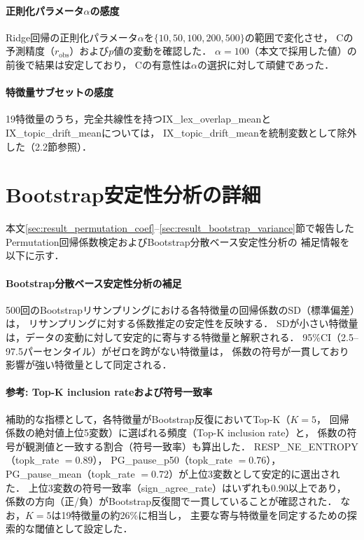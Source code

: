\documentclass[dvipdfmx,11pt,a4paper]{bxjsarticle}
\begin{document}
\paragraph{正則化パラメータ$\alpha$の感度}
Ridge回帰の正則化パラメータ$\alpha$を$\{10, 50, 100, 200, 500\}$の範囲で変化させ，
Cの予測精度（$r_{\text{obs}}$）および$p$値の変動を確認した．
$\alpha = 100$（本文で採用した値）の前後で結果は安定しており，
Cの有意性は$\alpha$の選択に対して頑健であった．

\paragraph{特徴量サブセットの感度}
19特徴量のうち，完全共線性を持つIX\_lex\_overlap\_meanとIX\_topic\_drift\_meanについては，
IX\_topic\_drift\_meanを統制変数として除外した（2.2節参照）．

\section{Bootstrap安定性分析の詳細}
\label{sec:appendix_bootstrap}

本文\ref{sec:result_permutation_coef}--\ref{sec:result_bootstrap_variance}節で報告したPermutation回帰係数検定およびBootstrap分散ベース安定性分析の
補足情報を以下に示す．

\paragraph{Bootstrap分散ベース安定性分析の補足}
500回のBootstrapリサンプリングにおける各特徴量の回帰係数のSD（標準偏差）は，
リサンプリングに対する係数推定の安定性を反映する．
SDが小さい特徴量は，データの変動に対して安定的に寄与する特徴量と解釈される．
95\%CI（2.5--97.5パーセンタイル）がゼロを跨がない特徴量は，
係数の符号が一貫しており影響が強い特徴量として同定される．

\paragraph{参考: Top-K inclusion rateおよび符号一致率}
補助的な指標として，各特徴量がBootstrap反復においてTop-K（$K = 5$，
回帰係数の絶対値上位5変数）に選ばれる頻度（Top-K inclusion rate）と，
係数の符号が観測値と一致する割合（符号一致率）も算出した．
RESP\_NE\_ENTROPY（topk\_rate $= 0.89$），
PG\_pause\_p50（topk\_rate $= 0.76$），
PG\_pause\_mean（topk\_rate $= 0.72$）が上位3変数として安定的に選出された．
上位3変数の符号一致率（sign\_agree\_rate）はいずれも0.90以上であり，
係数の方向（正/負）がBootstrap反復間で一貫していることが確認された．
なお，$K = 5$は19特徴量の約26\%に相当し，
主要な寄与特徴量を同定するための探索的な閾値として設定した．
\end{document}
